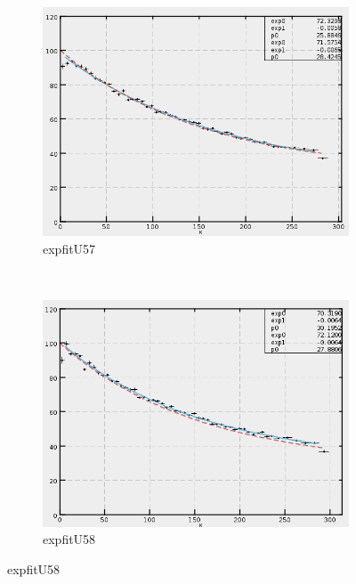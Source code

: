\begin{figure}[h]
    \begin{subfigure}[h]{0.44\textwidth}
        \centering
        \includegraphics[width=\textwidth, keepaspectratio = true]{expfit_U57}
        \caption{expfitU57}
        \label{fig:expfit_U57}
    \end{subfigure}
    ~
    \begin{subfigure}[h]{0.44\textwidth}
        \centering
        \includegraphics[width=\textwidth, keepaspectratio = true]{expfit_U58}
        \caption{expfitU58}
        \label{fig:expfit_U58}
    \end{subfigure}
    

\end{figure}
